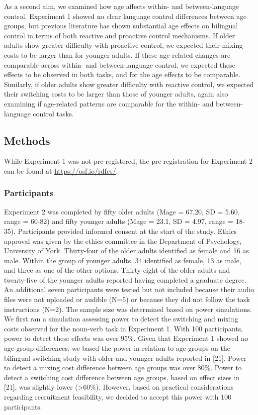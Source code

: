 \documentclass[
]{article}
\begin{document}
As a second aim, we examined how age affects within- and between-language control. Experiment 1 showed no clear language control differences between age groups, but previous literature has shown substantial age effects on bilingual control in terms of both reactive and proactive control mechanisms. If older adults show greater difficulty with proactive control, we expected their mixing costs to be larger than for younger adults. If these age-related changes are comparable across within- and between-language control, we expected these effects to be observed in both tasks, and for the age effects to be comparable. Similarly, if older adults show greater difficulty with reactive control, we expected their switching costs to be larger than those of younger adults, again also examining if age-related patterns are comparable for the within- and between-language control tasks.

\hypertarget{methods-1}{%
\subsection{Methods}\label{methods-1}}

While Experiment 1 was not pre-registered, the pre-registration for Experiment 2 can be found at \url{https://osf.io/rdfcs/}.

\hypertarget{participants-1}{%
\subsubsection{Participants}\label{participants-1}}

Experiment 2 was completed by fifty older adults (Mage = 67.20, SD = 5.60, range = 60-82) and fifty younger adults (Mage = 23.1, SD = 4.97, range = 18-35). Participants provided informed consent at the start of the study. Ethics approval was given by the ethics committee in the Department of Psychology, University of York. Thirty-four of the older adults identified as female and 16 as male. Within the group of younger adults, 34 identified as female, 13 as male, and three as one of the other options. Thirty-eight of the older adults and twenty-five of the younger adults reported having completed a graduate degree. An additional seven participants were tested but not included because their audio files were not uploaded or audible (N=5) or because they did not follow the task instructions (N=2). The sample size was determined based on power simulations. We first ran a simulation assessing power to detect the switching and mixing costs observed for the noun-verb task in Experiment 1. With 100 participants, power to detect these effects was over 95\%. Given that Experiment 1 showed no age-group differences, we based the power in relation to age groups on the bilingual switching study with older and younger adults reported in {[}21{]}. Power to detect a mixing cost difference between age groups was over 80\%. Power to detect a switching cost difference between age groups, based on effect sizes in {[}21{]}, was slightly lower (\textgreater60\%). However, based on practical considerations regarding recruitment feasibility, we decided to accept this power with 100 participants.
\end{document}
